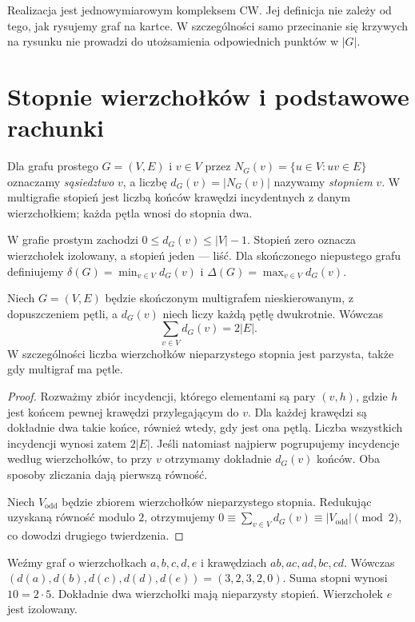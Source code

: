 Realizacja jest jednowymiarowym kompleksem CW. Jej definicja nie
zależy od tego, jak rysujemy graf na kartce. W szczególności
samo przecinanie się krzywych na rysunku nie prowadzi do
utożsamienia odpowiednich punktów w $|G|$.

\section{Stopnie wierzchołków i podstawowe rachunki}
\label{sec:tg-stopnie}

\begin{definicja}[Stopień]
Dla grafu prostego $G=(V,E)$ i $v\in V$ przez
$N_G(v)=\{u\in V:uv\in E\}$ oznaczamy
\emph{sąsiedztwo} $v$, a liczbę $d_G(v)=|N_G(v)|$
nazywamy \emph{stopniem} $v$. W multigrafie stopień
jest liczbą końców krawędzi incydentnych z danym
wierzchołkiem; każda pętla wnosi do stopnia dwa.
\end{definicja}

W grafie prostym zachodzi $0\le d_G(v)\le |V|-1$.
Stopień zero oznacza wierzchołek izolowany, a stopień jeden
--- liść. Dla skończonego niepustego grafu definiujemy
$\delta(G)=\min_{v\in V}d_G(v)$ i
$\Delta(G)=\max_{v\in V}d_G(v)$.

\begin{twierdzenie}
Niech $G=(V,E)$ będzie skończonym multigrafem
nieskierowanym, z dopuszczeniem pętli, a $d_G(v)$
niech liczy każdą pętlę dwukrotnie. Wówczas
\[
\sum_{v\in V}d_G(v)=2|E|.
\]
W szczególności liczba wierzchołków nieparzystego
stopnia jest parzysta, także gdy multigraf ma pętle.
\end{twierdzenie}

\begin{proof}
Rozważmy zbiór incydencji, którego elementami są pary
$(v,h)$, gdzie $h$ jest końcem pewnej krawędzi przylegającym
do $v$. Dla każdej krawędzi są dokładnie dwa takie końce,
również wtedy, gdy jest ona pętlą. Liczba wszystkich
incydencji wynosi zatem $2|E|$. Jeśli natomiast
najpierw pogrupujemy incydencje według wierzchołków,
to przy $v$ otrzymamy dokładnie $d_G(v)$ końców.
Oba sposoby zliczania dają pierwszą równość.

Niech $V_{\mathrm{odd}}$ będzie zbiorem wierzchołków
nieparzystego stopnia. Redukując uzyskaną równość modulo
$2$, otrzymujemy
$0\equiv\sum_{v\in V}d_G(v)\equiv
|V_{\mathrm{odd}}|\pmod2$, co dowodzi drugiego twierdzenia.
\end{proof}

\begin{przyklad}
Weźmy graf o wierzchołkach $a,b,c,d,e$ i krawędziach
$ab,ac,ad,bc,cd$. Wówczas
$(d(a),d(b),d(c),d(d),d(e))=(3,2,3,2,0)$.
Suma stopni wynosi $10=2\cdot5$. Dokładnie dwa
wierzchołki mają nieparzysty stopień. Wierzchołek $e$
jest izolowany.
\end{przyklad}


